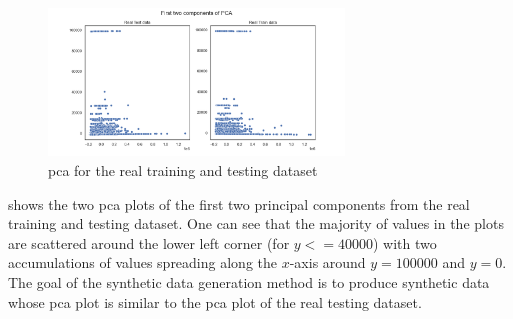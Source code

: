 \begin{figure}[H]
	\centering
	\includegraphics[width=0.7\textwidth]{images/pca/pca.png}
	\caption[PCA plot Real Data]{\gls{pca} for the real training and testing dataset}
	\label{fig:pca}
\end{figure}


 shows the two \gls{pca} plots of the first two principal components from the real training and testing dataset.
One can see that the majority of values in the plots are scattered around the lower left corner (for $y<=40000$) with two accumulations of values spreading along the $x$-axis around $y=100000$ and $y=0$.
The goal of the synthetic data generation method is to produce synthetic data whose \gls{pca} plot is similar to the \gls{pca} plot of the real testing dataset.\newpage


